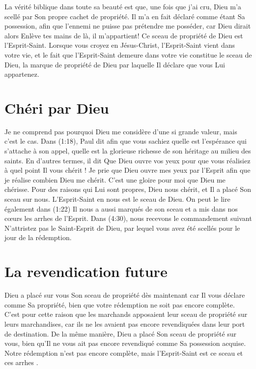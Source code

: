 La vérité biblique dans toute sa beauté est que, une fois que j'ai cru,
 Dieu m'a scellé par Son propre cachet de propriété.
 Il m'a en fait déclaré comme étant Sa possession, afin que l'ennemi
 ne puisse pas prétendre me posséder, car Dieu dirait alors\frcolon{}
 \Og  Enlève tes mains de là, il m'appartient! \Fg{}
 Ce sceau de propriété de Dieu est l'Esprit-Saint.
 Lorsque vous croyez en Jésus-Christ, l'Esprit-Saint vient dans votre vie,
 et le fait que l'Esprit-Saint demeure dans votre vie
 constitue le sceau de Dieu, la marque de propriété de Dieu
 par laquelle Il déclare que vous Lui appartenez.


\section{Ch\'eri par Dieu}

Je ne comprend pas pourquoi Dieu me considère d'une si grande valeur,
 mais c'est le cas.
 Dans (1:18), Paul dit\frcolon{}
 \Og [\dots{}] afin que vous sachiez quelle est l'espérance
 qui s'attache à son appel, quelle est la glorieuse richesse
 de son héritage au milieu des saints. \Fg{}
 En d'autres termes, il dit\frcolon{}
 \Og Que Dieu ouvre vos yeux pour que vous réalisiez
 à quel point Il vous chérit ! \Fg{}
 Je prie que Dieu ouvre mes yeux par l'Esprit afin que je réalise
 combien Dieu me chérit. C'est une gloire pour moi que Dieu me chérisse.
 Pour des raisons qui Lui sont propres, Dieu nous chérit,
 et Il a placé Son sceau sur nous.
 L'Esprit-Saint en nous est le sceau de Dieu.
 On peut le lire également dans (1:22)\frcolon{}
 \Og Il nous a aussi marqués de son sceau et a mis dans nos cœurs
 les arrhes de l'Esprit. \Fg{}
 Dans (4:30), nous recevons le commandement suivant\frcolon{}
 \Og N'attristez pas le Saint-Esprit de Dieu, par lequel
 vous avez été scellés pour le jour de la rédemption. \Fg{}


\section{La revendication future}

Dieu a placé sur vous Son sceau de propriété dès maintenant
 car Il vous déclare comme Sa propriété, bien que votre rédemption
 ne soit pas encore complète.
 C'est pour cette raison que les marchands apposaient leur sceau de propriété
 sur leurs marchandises, car ils ne les avaient pas encore revendiquées
 dans leur port de destination.
 De la même manière, Dieu a placé Son sceau de propriété sur vous,
 bien qu'Il ne vous ait pas encore revendiqué comme Sa possession acquise.
 Notre rédemption n'est pas encore complète,
 mais l'Esprit-Saint est ce sceau et \Og ces arrhes \Fg{}.


